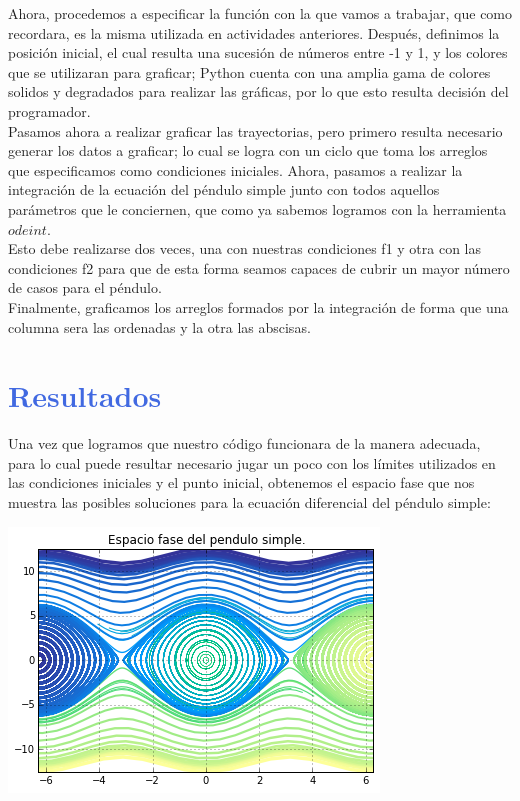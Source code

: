 \documentclass[12pt]{article}
\begin{document}
Ahora, procedemos a especificar la función con la que vamos a trabajar, que como recordara, es la misma utilizada en actividades anteriores. Después, definimos la posición inicial, el cual resulta una sucesión de números entre -1 y 1, y los colores que se utilizaran para graficar; Python cuenta con una amplia gama de colores solidos y degradados para realizar las gráficas, por lo que esto resulta decisión del programador.\\

Pasamos ahora a realizar graficar las trayectorias, pero primero resulta necesario generar los datos a graficar; lo cual se logra con un ciclo que toma los arreglos que especificamos como condiciones iniciales. Ahora, pasamos a realizar la integración de la ecuación del péndulo simple junto con todos aquellos parámetros que le conciernen, que como ya sabemos logramos con la herramienta $odeint$.\\

Esto debe realizarse dos veces, una con nuestras condiciones f1 y otra con las condiciones f2 para que de esta forma seamos capaces de cubrir un mayor número de casos para el péndulo.\\

Finalmente, graficamos los arreglos formados por la integración de forma que una columna sera las ordenadas y la otra las abscisas.







\pagebreak

\section*{\textcolor{RoyalBlue}{Resultados}}
Una vez que logramos que nuestro código funcionara de la manera adecuada, para lo cual puede resultar necesario jugar un poco con los límites utilizados en las condiciones iniciales y el punto inicial, obtenemos el espacio fase que nos muestra las posibles soluciones para la ecuación diferencial del péndulo simple:

\includegraphics{actividad7.png}
\end{document}
